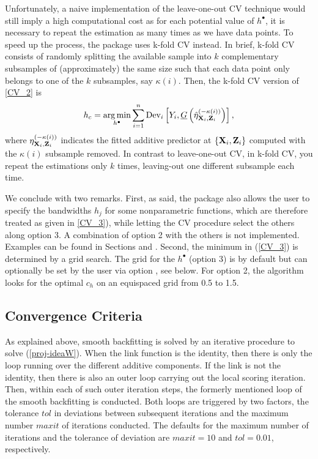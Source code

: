 Unfortunately, a naive implementation of the leave-one-out CV technique would still imply a high computational cost as for each potential value of $h^\bullet$, it is necessary to repeat the estimation as many times as we have data points. To speed up the process, the  package uses k-fold CV instead. In brief, k-fold CV consists of randomly splitting the available sample into $k$ complementary subsamples of (approximately) the same size such that each data point only belongs to one of the $k$ subsamples, say $\kappa(i)$. Then, the k-fold CV version of \eqref{CV_2} is
\begin{equation}
h_c =
\underset{h^\bullet} {\operatorname{arg\min} }  
\sum_{i=1}^n \mbox{Dev}_i \left [ {Y_i, \underline{G} \left({
\hat \eta^{(-\kappa(i))}_{{\bf X}_i,{\bf Z}_i}
 }\right)}\right],
\label{CV_3}
\end{equation}
where $\eta^{(-\kappa(i))}_{{\bf X}_i,{\bf Z}_i}$ indicates the fitted additive predictor at $\left \{{{\bf X}_i,{\bf Z}_i}\right\}$ computed with the $\kappa(i)$ subsample removed. In contrast to leave-one-out CV, in k-fold CV, you repeat the estimations only $k$ times, leaving-out one different subsample each time. 

We conclude with two remarks. First, as said, the  package also allows the user to specify the bandwidths $h_j$ for some nonparametric functions, which are therefore treated as given in \eqref{CV_3}), while letting the CV procedure select the others along option 3.
A combination of option 2 with the others is not implemented. Examples can be found in Sections  and . Second, the minimum in (\ref{CV_3}) is determined by a grid search. The grid for the $h^\bullet$ (option 3) is by default   but can optionally be set by the user via option  , see below. For option 2, the algorithm looks for the optimal $c_h$ on an equispaced grid from 0.5 to 1.5.



\subsection{Convergence Criteria}

As explained above, smooth backfitting is solved by an iterative procedure to solve
(\ref{proj-ideaW}). When the link function is the identity, then there is only the loop 
running over the different additive components.
If the link is not the identity, then there is also an outer loop carrying out the local scoring iteration. Then, within each of such outer iteration steps, the formerly mentioned loop of the smooth backfitting is conducted. Both loops are triggered by two factors, the tolerance $tol$ in deviations between subsequent iterations and the maximum number $maxit$ of iterations conducted. The defaults for the maximum number of iterations and the tolerance of deviation are  $maxit=10$ and $tol=0.01$, respectively.


